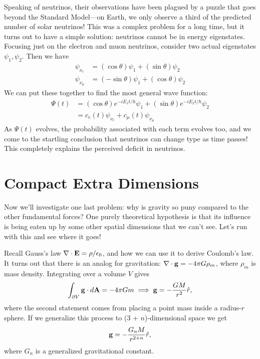 \documentclass[../p052main.tex]{subfiles}
\begin{document}
Speaking of neutrinos, their observations have been plagued by a puzzle that goes beyond the Standard Model---on Earth, we only observe a third of the predicted number of solar neutrinos!
This was a complex problem for a long time, but it turns out to have a simple solution: neutrinos cannot be in energy eigenstates.
Focusing just on the electron and muon neutrinos, consider two actual eigenstates $\psi_1, \psi_2$.
Then we have
\begin{align*}
    \psi_{\nu_e} &= (\cos \theta) \psi_1 + (\sin \theta) \psi_2 \\
    \psi_{\nu_\mu} &= (-\sin \theta) \psi_1 + (\cos \theta) \psi_2
\end{align*}
We can put these together to find the most general wave function:
\begin{align*}
    \Psi(t) &= (\cos \theta) e^{-iE_1 t / \hbar} \psi_1 + (\sin \theta) e^{-iE_2 t / \hbar} \psi_2 \\
    &= c_e(t) \psi_{\nu_e} + c_\mu(t) \psi_{\nu_\mu}
\end{align*}
As $\Psi(t)$ evolves, the probability associated with each term evolves too, and we come to the startling conclusion that neutrinos can change type as time passes!
This completely explains the perceived deficit in neutrinos.

\section{Compact Extra Dimensions}
Now we'll investigate one last problem: why is gravity so puny compared to the other fundamental forces?
One purely theoretical hypothesis is that its influence is being eaten up by some other spatial dimensions that we can't see.
Let's run with this and see where it goes!

Recall Gauss's law $\nabla \cdot \mathbf{E} = \rho / \epsilon_0$, and how we can use it to derive Coulomb's law.
It turns out that there is an analog for gravitation: $\nabla \cdot \mathbf{g} = -4\pi G \rho_m$, where $\rho_m$ is mass density.
Integrating over a volume $V$ gives
\[ \int_{\partial V} \mathbf{g} \cdot d\mathbf{A} = -4\pi Gm \implies \mathbf{g} = -\frac{GM}{r^2} \hat r, \]
where the second statement comes from placing a point mass inside a radius-$r$ sphere.
If we generalize this process to (3 + $n$)-dimensional space we get
\[ \mathbf{g} = -\frac{G_n M}{r^{2+n}} \hat r, \]
where $G_n$ is a generalized gravitational constant.
\end{document}
